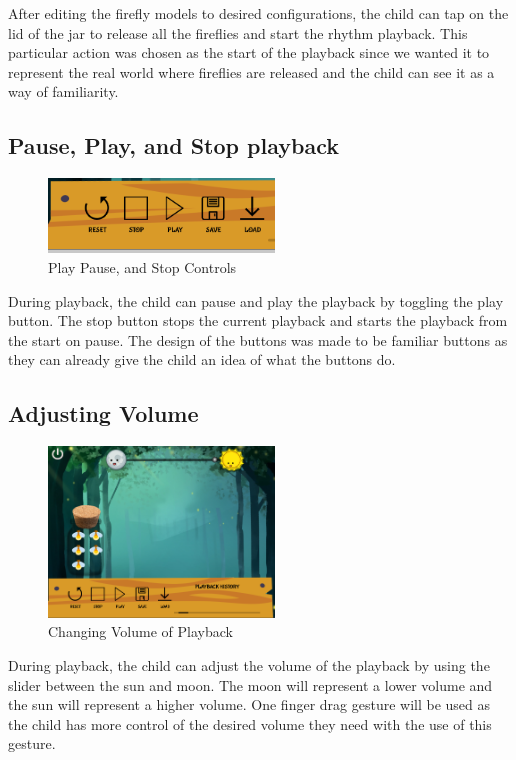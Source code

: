 After editing the firefly models to desired configurations, the child can tap on the lid of the jar to release all the fireflies and start the rhythm playback. This particular action was chosen as the start of the playback since we wanted it to represent the real world where fireflies are released and the child can see it as a way of familiarity.

\subsection{Pause, Play, and Stop playback}

\begin{figure}[H]
    \centering
    \includegraphics[width=6cm]{figures/StopPlayPause.png}
    \caption{Play Pause, and Stop Controls}
    \label{fig:firefly2}
\end{figure}

During playback, the child can pause and play the playback by toggling the play button. The stop button stops the current playback and starts the playback from the start on pause. The design of the buttons was made to be familiar buttons as they can already give the child an idea of what the buttons do.
 
\subsection{Adjusting Volume}

\begin{figure}[H]
    \centering
    \includegraphics[width=6cm]{figures/volumecontrol.png}
    \caption{Changing Volume of Playback}
    \label{fig:volcontrol}
\end{figure}

During playback, the child can adjust the volume of the playback by using the slider between the sun and moon. The moon will represent a lower volume and the sun will represent a higher volume. One finger drag gesture will be used as the child has more control of the desired volume they need with the use of this gesture.

